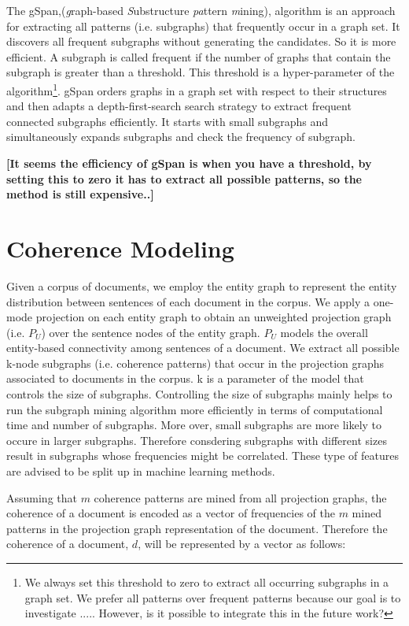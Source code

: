 The gSpan,(\textit{g}raph-based \textit{S}ubstructure \textit{pa}ttern \textit{m}ining), algorithm is an approach for extracting all patterns (i.e. subgraphs) that frequently occur in a graph set. 
It discovers all frequent subgraphs without generating the candidates. 
So it is more efficient. 
A subgraph is called frequent if the number of graphs that contain the subgraph is greater than a threshold. 
This threshold is a hyper-parameter of the algorithm\footnote{We always set this threshold to zero to extract all occurring subgraphs in a graph set. We prefer all patterns over frequent patterns because our goal is to investigate .....
 However, is it possible to integrate this in the future work?}.
 gSpan orders graphs in a graph set with respect to their structures and then adapts a depth-first-search search strategy to extract frequent connected subgraphs efficiently. 
 It starts with small subgraphs and simultaneously expands subgraphs and check the frequency of subgraph. 

\textbf{
 [It seems the efficiency of gSpan is when you have a threshold, by setting this to zero it has to extract all possible patterns, so the method is still expensive..]
}


\section{Coherence Modeling}
\label{sec:automatic_extraction}
%
Given a corpus of documents, we employ the entity graph to represent the entity distribution between sentences of each document in the corpus. 
We apply a one-mode projection on each entity graph to obtain an unweighted projection graph (i.e. $P_U$) over the sentence nodes of the entity graph. 
$P_U$ models the overall entity-based connectivity among sentences of a document. 
We extract all possible k-node subgraphs (i.e. coherence patterns) that occur in the projection graphs associated to documents in the corpus. 
k is a parameter of the model that controls the size of subgraphs. 
Controlling the size of subgraphs mainly helps to run the subgraph mining algorithm more efficiently in terms of computational time and number of subgraphs. 
More over, small subgraphs are more likely to occure in larger subgraphs. 
Therefore consdering subgraphs with different sizes result in subgraphs whose frequencies might be correlated. 
These type of features are advised to be split up in machine learning methods. 

Assuming that $m$ coherence patterns are mined from all projection graphs, the coherence of a document is encoded as a vector of frequencies of the $m$ mined patterns in the projection graph representation of the document. 
Therefore the coherence of a document, $d$, will be represented by a vector as follows:

